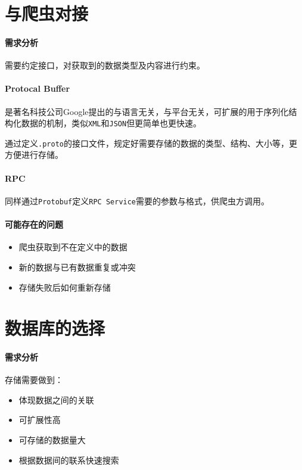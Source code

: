 \documentclass[UTF8]{ctexrep}
\begin{document}
\section{与爬虫对接}

\paragraph{需求分析}

需要约定接口，对获取到的数据类型及内容进行约束。

\paragraph{Protocal Buffer}

是著名科技公司\textmd{Google}提出的与语言无关，与平台无关，可扩展的用于序列化结构化数据的机制，类似\texttt{XML}和\texttt{JSON}但更简单也更快速。

\par
通过定义\texttt{.proto}的接口文件，规定好需要存储的数据的类型、结构、大小等，更方便进行存储。

\paragraph{RPC}

同样通过\texttt{Protobuf}定义\texttt{RPC Service}需要的参数与格式，供爬虫方调用。

\paragraph{可能存在的问题}

\begin{itemize}
    \item 爬虫获取到不在定义中的数据
    \item 新的数据与已有数据重复或冲突
    \item 存储失败后如何重新存储
\end{itemize}

\section{数据库的选择}

\paragraph{需求分析}

存储需要做到：
\begin{itemize}
    \item 体现数据之间的关联
    \item 可扩展性高
    \item 可存储的数据量大
    \item 根据数据间的联系快速搜索
\end{itemize}
\end{document}
